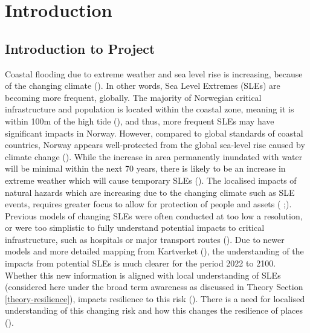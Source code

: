 
\chapter{Introduction}
\section{Introduction to Project}
Coastal flooding due to extreme weather and sea level rise is increasing, because of the changing climate (\cite{ipcc_sea_2021}).  In other words, Sea Level Extremes (SLEs) are becoming more frequent, globally. The majority of Norwegian critical infrastructure and population is located within the coastal zone, meaning it is within 100m of the high tide (\cite{engebakken_construction_2022}), and thus, more frequent SLEs may have significant impacts in Norway. However, compared to global standards of coastal countries, Norway appears well-protected from the global sea-level rise caused by climate change (\cite{aunan_strong_2008}). While the increase in area permanently inundated with water will be minimal within the next 70 years, there is likely to be an increase in extreme weather which will cause temporary SLEs (\cite{aunan_strong_2008}). The localised impacts of natural hazards which are increasing due to the changing climate such as SLE events, requires greater focus to allow for protection of people and assets (\cite{lujala_quantifying_2014} ;\cite{aunan_strong_2008}). Previous models of changing SLEs were often conducted at too low a resolution, or were too simplistic to fully understand potential impacts to critical infrastructure, such as hospitals or major transport routes (\cite{hoffken_effects_2020}). Due to newer models and more detailed mapping from Kartverket (\cite{kartverket_se_2021}), the understanding of the impacts from potential SLEs is much clearer for the period 2022 to 2100. Whether this new information is aligned with local understanding of SLEs (considered here under the broad term awareness as discussed in Theory Section \ref{theory-resilience}), impacts resilience to this risk (\cite{setten_we_2019}).  There is a need for localised understanding of this changing risk and how this changes the resilience of places (\cite{rod_integrated_2012}).
\paragraph{}

